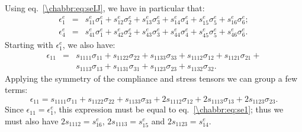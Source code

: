 Using eq.~\ref{\chabbr:eq:seIJ}, we have in particular that:
\begin{eqnarray}
	\epsilon^e_1 &=& s^e_{11}\sigma^e_1+s^e_{12}\sigma^e_2+s^e_{13}\sigma^e_3+s^e_{14}\sigma^e_4+s^e_{15}\sigma^e_5+s^e_{16}\sigma^e_6;\label{\chabbr:eq:se1}\\
	\epsilon^e_4 &=& s^e_{41}\sigma^e_1+s^e_{42}\sigma^e_2+s^e_{43}\sigma^e_3+s^e_{44}\sigma^e_4+s^e_{45}\sigma^e_5+s^e_{46}\sigma^e_6\label{\chabbr:eq:se4}.
\end{eqnarray}
Starting with $\epsilon^e_1$, we also have:
\begin{eqnarray*}
	\epsilon_{11} &=& s_{1111}\sigma_{11} + s_{1122}\sigma_{22} + s_{1133}\sigma_{33} +  s_{1112}\sigma_{12} +  s_{1121}\sigma_{21}  + \\ 
	&& s_{1113}\sigma_{13}+ s_{1131}\sigma_{31} + s_{1123}\sigma_{23} + s_{1132}\sigma_{32}. 
\end{eqnarray*}
Applying the symmetry of the compliance and stress tensors we can group a few terms:
\[	
	\epsilon_{11} = s_{1111}\sigma_{11} + s_{1122}\sigma_{22} + s_{1133}\sigma_{33} + 2 s_{1112}\sigma_{12} +2 s_{1113}\sigma_{13} +2 s_{1123}\sigma_{23}. 
\]
Since $\epsilon_{11}=\epsilon^e_1$, this expression must be equal to eq.~\ref{\chabbr:eq:se1}; thus we must also have $2s_{1112} = s^e_{16}$, $2s_{1113}=s^e_{15}$ and $2s_{1123} = s^e_{14}$.

